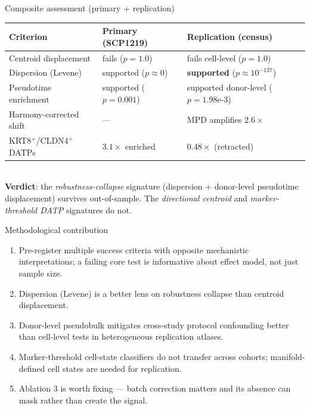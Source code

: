 \documentclass[aspectratio=169]{beamer}
\begin{document}
\begin{frame}{Composite assessment (primary + replication)}
\small
\begin{tabular}{lll}
\toprule
Criterion & Primary (SCP1219) & Replication (census) \\
\midrule
Centroid displacement & \alert{fails} ($p=1.0$) & \alert{fails cell-level} ($p=1.0$) \\
Dispersion (Levene) & supported ($p\approx 0$) & \textbf{supported} ($p\approx 10^{-137}$) \\
Pseudotime enrichment & supported ($p=0.001$) & supported donor-level ($p=1.98\text{e-}3$) \\
Harmony-corrected shift & --- & MPD amplifies $2.6\times$ \\
KRT8$^+$/CLDN4$^+$ DATPs & $3.1\times$ enriched & \alert{$0.48\times$ (retracted)} \\
\bottomrule
\end{tabular}
\\[4pt]
\textbf{Verdict}: the \emph{robustness-collapse} signature (dispersion + donor-level
pseudotime displacement) survives out-of-sample. The \emph{directional centroid} and
\emph{marker-threshold DATP} signatures do not.
\end{frame}

\begin{frame}{Methodological contribution}
\begin{enumerate}
  \item Pre-register multiple success criteria with opposite mechanistic interpretations;
        a failing core test is informative about effect model, not just sample size.
  \item Dispersion (Levene) is a better lens on robustness collapse than centroid
        displacement.
  \item Donor-level pseudobulk mitigates cross-study protocol confounding better than
        cell-level tests in heterogeneous replication atlases.
  \item Marker-threshold cell-state classifiers do not transfer across cohorts;
        manifold-defined cell states are needed for replication.
  \item Ablation 3 is worth fixing --- batch correction matters and its absence can mask
        rather than create the signal.
\end{enumerate}
\end{frame}
\end{document}
